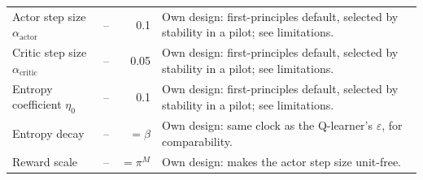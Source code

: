 \begin{tabular}{lrr>{\raggedright\arraybackslash}p{5.6cm}}
\midrule
Actor step size $\alpha_{\mathrm{actor}}$ & -- & 0.1 & Own design: first-principles default, selected by stability in a pilot; see limitations. \\
Critic step size $\alpha_{\mathrm{critic}}$ & -- & 0.05 & Own design: first-principles default, selected by stability in a pilot; see limitations. \\
Entropy coefficient $\eta_0$ & -- & 0.1 & Own design: first-principles default, selected by stability in a pilot; see limitations. \\
Entropy decay & -- & $=\beta$ & Own design: same clock as the Q-learner's $\varepsilon$, for comparability. \\
Reward scale & -- & $=\pi^M$ & Own design: makes the actor step size unit-free. \\
\bottomrule
\end{tabular}
